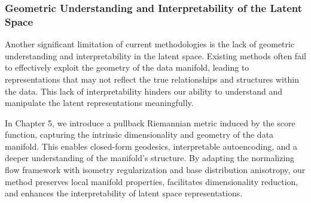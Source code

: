 \subsubsection{Geometric Understanding and Interpretability of the Latent Space}

Another significant limitation of current methodologies is the lack of geometric understanding and interpretability in the latent space. Existing methods often fail to effectively exploit the geometry of the data manifold, leading to representations that may not reflect the true relationships and structures within the data. This lack of interpretability hinders our ability to understand and manipulate the latent representations meaningfully.


In Chapter 5, we introduce a pullback Riemannian metric induced by the score function, capturing the intrinsic dimensionality and geometry of the data manifold. This enables closed-form geodesics, interpretable autoencoding, and a deeper understanding of the manifold's structure. By adapting the normalizing flow framework with isometry regularization and base distribution anisotropy, our method preserves local manifold properties, facilitates dimensionality reduction, and enhances the interpretability of latent space representations.
